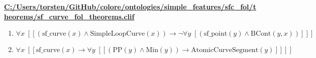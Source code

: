\documentclass{article}
\begin{document}
\textbf{\url{C:/Users/torsten/GitHub/colore/ontologies/simple\_features/sfc\_fol/theorems/sf\_curve\_fol\_theorems.clif}}

\begin{enumerate}
\item $\forall x\;  \left[ \left[ \left(\textrm{sf\_curve}(x) \land \textrm{SimpleLoopCurve}(x)\right) \rightarrow \neg \forall y\;  \left[ \left(\textrm{sf\_point}(y) \land \textrm{BCont}(y,x)\right) \right] \right] \right]$
\item $\forall x\;  \left[ \left[ \textrm{sf\_curve}(x) \rightarrow \forall y\;  \left[ \left[ \left(\textrm{PP}(y) \land \textrm{Min}(y)\right) \rightarrow \textrm{AtomicCurveSegment}(y) \right] \right] \right] \right]$
\end{enumerate}
\end{document}
